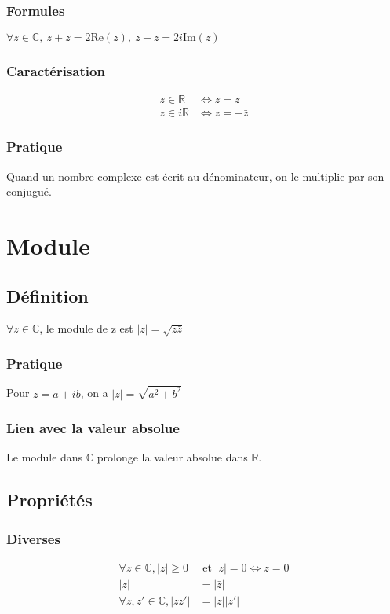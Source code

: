 \documentclass[12pt,a4paper,french]{book}
\begin{document}
			\subsubsection{Formules}
			$\forall z \in \mathbb{C}, \ z+ \bar{z} = 2\mbox{Re}(z), \ z - \bar{z} = 2i\mbox{Im}(z)$
		
			\subsubsection{Caractérisation}
				\begin{equation} \begin{split}
						z \in \mathbb{R} &\Leftrightarrow z = \bar{z} \\
						z \in i\mathbb{R} &\Leftrightarrow z = -\bar{z}
					\end{split}
				\end{equation} 
			\subsubsection{Pratique}
				Quand un nombre complexe est écrit au dénominateur, on le multiplie par son conjugué.
	\section{Module}
		\subsection{Définition}
			$\forall z \in \mathbb{C}$, le module de z est $\left| z\right| = \sqrt{z \bar{z}}$
			\subsubsection{Pratique}
			Pour $z=a+ib$, on a $\left| z\right| = \sqrt{a^2 + b^2}$
			\subsubsection{Lien avec la valeur absolue}
			Le module dans $\mathbb{C}$ prolonge la valeur absolue dans $\mathbb{R}$.
		\subsection{Propriétés}
			\subsubsection{Diverses}
			\[\begin{split}
				\forall z \in \mathbb{C},\left| z\right| \geqslant 0 &\mbox{ et } \left| z\right| = 0 \Leftrightarrow z= 0 \\
				\left| z \right| &= \left| \bar{z} \right| \\
				\forall z,z' \in \mathbb{C},\left| zz' \right|& = \left| z \right| \left| z' \right| 
			\end{split} \]
\end{document}
